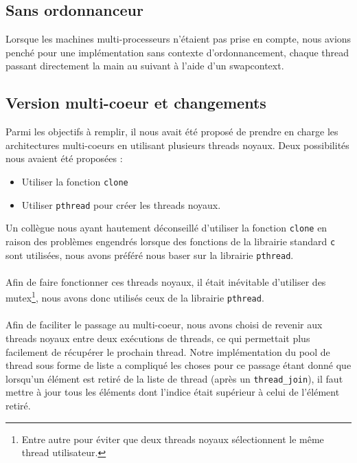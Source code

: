 \documentclass{article}
\begin{document}
		\subsection{Sans ordonnanceur}
        Lorsque les machines multi-processeurs n'étaient pas prise en compte,
        nous avions penché pour une implémentation sans contexte
        d'ordonnancement, chaque thread passant directement la main au
        suivant à l'aide d'un swapcontext.

		\subsection{Version multi-coeur et changements}
		Parmi les objectifs à remplir, il nous avait été proposé de prendre
        en charge les architectures multi-coeurs en utilisant plusieurs
        threads noyaux. Deux possibilités nous avaient été proposées :
        \begin{itemize}
          \item Utiliser la fonction \verb!clone!
          \item Utiliser \verb!pthread! pour créer les threads noyaux.
        \end{itemize}
        Un collègue nous ayant hautement déconseillé d'utiliser la fonction
        \verb!clone! en raison des problèmes engendrés lorsque des fonctions
        de la librairie standard \verb!c! sont utilisées, nous avons préféré
        nous baser sur la librairie \verb!pthread!.
        \paragraph{}
        Afin de faire fonctionner ces threads noyaux, il était inévitable
        d'utiliser des mutex\footnote{Entre autre pour éviter que deux
          threads noyaux sélectionnent le même thread utilisateur.}, nous
        avons donc utilisés ceux de la librairie \verb!pthread!. 
        \paragraph{}
        Afin de faciliter le passage au multi-coeur, nous avons choisi
        de revenir aux threads noyaux entre deux exécutions de threads, ce
        qui permettait plus facilement de récupérer le prochain thread. Notre
        implémentation du pool de thread sous forme de liste a compliqué les
        choses pour ce passage étant donné que lorsqu'un élément est retiré
        de la liste de thread (après un \verb!thread_join!), il faut mettre
        à jour tous les éléments dont l'indice était supérieur à celui de
        l'élément retiré.
\end{document}
